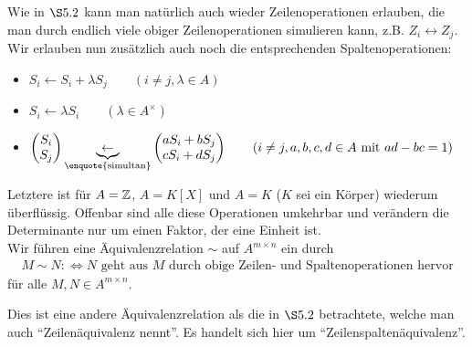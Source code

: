 \documentclass[../../main.tex]{subfiles}
\begin{document}
Wie in $\S5.2$ kann man natürlich auch wieder Zeilenoperationen erlauben, die man durch endlich viele obiger Zeilenoperationen simulieren kann, z.B. $Z_i\longleftrightarrow Z_j$. Wir erlauben nun zusätzlich auch noch die entsprechenden Spaltenoperationen:
\begin{itemize}
\item
$S_i\leftarrow S_i+\lambda S_j
\qquad(i\neq j, \lambda\in A)$
\item
$S_i\leftarrow \lambda S_i\qquad(\lambda\in A^\times)$
\item
$\begin{pmatrix*}S_i\\ S_j\end{pmatrix*}\underbrace{\leftarrow}_\text{\enquote{simultan}} \begin{pmatrix*}aS_i+bS_j\\ cS_i+dS_j\end{pmatrix*}\qquad( i\neq j, a,b,c,d\in A\text{ mit }ad-bc=1)$
\end{itemize}
Letztere ist für $A=\mathbb Z$, $A=K[X]$ und $A=K$ ($K$ sei ein Körper) wiederum überflüssig. Offenbar sind alle diese Operationen umkehrbar und verändern die Determinante nur um einen Faktor, der eine Einheit ist.\\
Wir führen eine Äquivalenzrelation $\sim$ auf $A^{m\times n}$ ein durch
\begin{align*}
M\sim N:\Longleftrightarrow N \text{ geht aus }M\text{ durch obige Zeilen- und Spaltenoperationen hervor}
\end{align*}
für alle $M,N\in A^{m\times n}$.

\begin{warning}\label{17.1.1}
Dies ist eine andere Äquivalenzrelation als die in $\S5.2$ betrachtete, welche man auch \enquote{Zeilenäquivalenz nennt}. Es handelt sich hier um \enquote{Zeilenspaltenäquivalenz}.
\end{warning}
\end{document}
